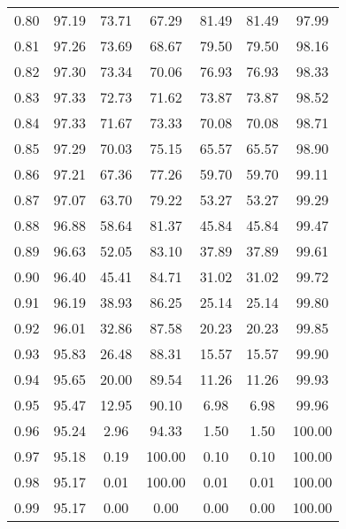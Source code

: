 \begin{tabular}{|c|c|c|c|c|c|c|}
      0.80 &     97.19 &     73.71 &      67.29 &   81.49 &      81.49 &         97.99 \\
      0.81 &     97.26 &     73.69 &      68.67 &   79.50 &      79.50 &         98.16 \\
      0.82 &     97.30 &     73.34 &      70.06 &   76.93 &      76.93 &         98.33 \\
      0.83 &     97.33 &     72.73 &      71.62 &   73.87 &      73.87 &         98.52 \\
      0.84 &     97.33 &     71.67 &      73.33 &   70.08 &      70.08 &         98.71 \\
      0.85 &     97.29 &     70.03 &      75.15 &   65.57 &      65.57 &         98.90 \\
      0.86 &     97.21 &     67.36 &      77.26 &   59.70 &      59.70 &         99.11 \\
      0.87 &     97.07 &     63.70 &      79.22 &   53.27 &      53.27 &         99.29 \\
      0.88 &     96.88 &     58.64 &      81.37 &   45.84 &      45.84 &         99.47 \\
      0.89 &     96.63 &     52.05 &      83.10 &   37.89 &      37.89 &         99.61 \\
      0.90 &     96.40 &     45.41 &      84.71 &   31.02 &      31.02 &         99.72 \\
      0.91 &     96.19 &     38.93 &      86.25 &   25.14 &      25.14 &         99.80 \\
      0.92 &     96.01 &     32.86 &      87.58 &   20.23 &      20.23 &         99.85 \\
      0.93 &     95.83 &     26.48 &      88.31 &   15.57 &      15.57 &         99.90 \\
      0.94 &     95.65 &     20.00 &      89.54 &   11.26 &      11.26 &         99.93 \\
      0.95 &     95.47 &     12.95 &      90.10 &    6.98 &       6.98 &         99.96 \\
      0.96 &     95.24 &      2.96 &      94.33 &    1.50 &       1.50 &        100.00 \\
      0.97 &     95.18 &      0.19 &     100.00 &    0.10 &       0.10 &        100.00 \\
      0.98 &     95.17 &      0.01 &     100.00 &    0.01 &       0.01 &        100.00 \\
      0.99 &     95.17 &      0.00 &       0.00 &    0.00 &       0.00 &        100.00 \\
\bottomrule
\end{tabular}
